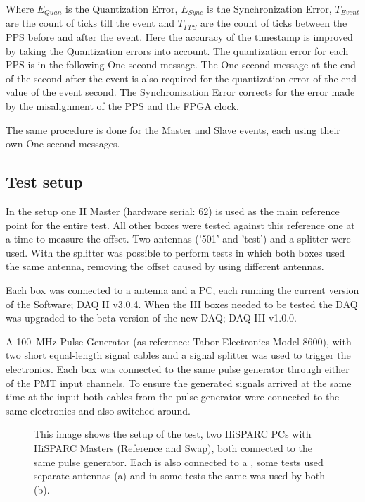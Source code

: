 Where $E_{Quan}$ is the Quantization Error, $E_{Sync}$ is the
Synchronization Error, $T_{Event}$ are the count of ticks till the event
and $T_{PPS}$ are the count of ticks between the PPS before and after
the event.
Here the accuracy of the timestamp is improved by taking the Quantization errors into account. The quantization error for each PPS is in the following One
second message. The One second message at the end of the second after
the event is also required for the quantization error of the end value
of the event second. The Synchronization Error corrects for the error made by the misalignment of the PPS and the FPGA clock.

The same procedure is done for the Master and Slave events, each using their own One second messages.


\subsection{Test setup}
\label{sub:gps_test_setup}

In the setup one \hisparc II Master (hardware serial: 62) is used as the
main reference point for the entire test. All other \hisparc boxes were
tested against this reference one at a time to measure the offset. Two
\gps antennas ('501' and 'test') and a \gps splitter were used. With
the splitter was possible to perform tests in which both \hisparc boxes used
the same \gps antenna, removing the offset caused by using different
\gps antennas.

Each \hisparc box was connected to a \gps antenna and a PC, each running
the current version of the \hisparc Software; \hisparc DAQ II v3.0.4.
When the \hisparc III boxes needed to be tested the DAQ was upgraded to
the beta version of the new DAQ; \hisparc DAQ III v1.0.0.

A \SI{100}{\mega\hertz} Pulse Generator (as reference: Tabor Electronics
Model 8600), with two short equal-length signal cables and a signal
splitter was used to trigger the \hisparc electronics. Each box was
connected to the same pulse generator through either of the PMT input
channels. To ensure the generated signals arrived at the same time at
the input both cables from the pulse generator were connected to the
same \hisparc electronics and also switched around.

\begin{figure}
    \centering
    
    \caption{This image shows the setup of the test, two HiSPARC PCs
             with HiSPARC Masters (Reference and Swap), both connected
             to the same pulse generator. Each is also connected to a
             \gps, some tests used separate \gps antennas (a) and in
             some tests the same \gps was used by both (b).}
    \label{fig:setup}
\end{figure}


